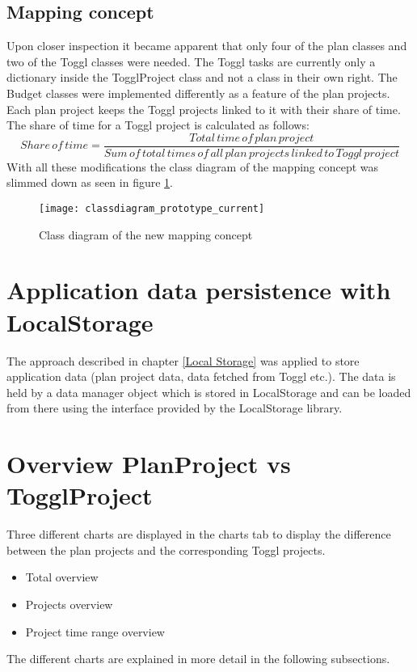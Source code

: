 \subsection{Mapping concept} \label{Mapping_result}
Upon closer inspection it became apparent that only four of the plan classes and two of the Toggl classes were needed. The Toggl tasks are currently only a dictionary inside the TogglProject class and not a class in their own right. The Budget classes were implemented differently as a feature of the plan projects. Each plan project keeps the Toggl projects linked to it with their share of time. The share of time for a Toggl project is calculated as follows:
\begin{equation*}
	Share \, of \, time = \frac{Total \, time \, of \, plan \, project}{Sum \, of \, total \, times \, of \, all \, plan \, projects \, linked \, to \, Toggl \, project}
\end{equation*}
With all these modifications the class diagram of the mapping concept was slimmed down as seen in figure \ref{classdiagram_prototype_current}.
\begin{figure}[H]
	\centering
	\texttt{[image: classdiagram\_prototype\_current]}
	\caption{Class diagram of the new mapping concept}
	\label{classdiagram_prototype_current}
\end{figure}

\section{Application data persistence with LocalStorage}
The approach described in chapter \ref{Local Storage} was applied to store application data (plan project data, data fetched from Toggl etc.). The data is held by a data manager object which is stored in LocalStorage and can be loaded from there using the interface provided by the LocalStorage library.

\section{Overview PlanProject vs TogglProject} \label{Graphical overview}
Three different charts are displayed in the charts tab to display the difference between the plan projects and the corresponding Toggl projects.
\begin{itemize}
	\item Total overview
	\item Projects overview
	\item Project time range overview
\end{itemize}
The different charts are explained in more detail in the following subsections.

